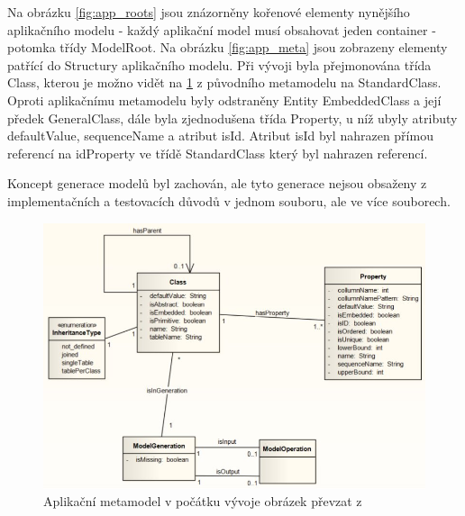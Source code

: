 \documentclass[11pt,twoside,a4paper]{book}
\begin{document}
Na obrázku \ref{fig:app_roots} jsou znázorněny kořenové elementy
nynějšího aplikačního modelu - každý aplikační model musí obsahovat jeden
container - potomka třídy ModelRoot. Na obrázku \ref{fig:app_meta} jsou
zobrazeny elementy patřící do Structury aplikačního modelu. Při vývoji byla
přejmonována třída Class, kterou je možno vidět na \ref{fig:lukes:app_meta} z
původního metamodelu na StandardClass.
Oproti aplikačnímu metamodelu \cite{Jezek} byly odstraněny Entity EmbeddedClass 
a její předek GeneralClass, dále byla zjednodušena třída Property, u níž ubyly
atributy defaultValue, sequenceName a atribut isId. Atribut isId byl nahrazen
přímou referencí na idProperty ve třídě StandardClass který byl nahrazen 
referencí.

Koncept generace modelů byl zachován, ale tyto generace nejsou obsaženy z
implementačních a testovacích důvodů v jednom souboru, ale ve více souborech.

\begin{figure}[ht]
\begin{center}
\includegraphics[width=15cm]{figures/app_meta_BP}
\caption{Aplikační metamodel v počátku vývoje obrázek převzat z \cite{Lukes}}
\label{fig:lukes:app_meta}
\end{center}
\end{figure}
\end{document}
